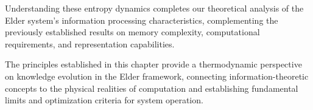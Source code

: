 Understanding these entropy dynamics completes our theoretical analysis of the Elder system's information processing characteristics, complementing the previously established results on memory complexity, computational requirements, and representation capabilities.

The principles established in this chapter provide a thermodynamic perspective on knowledge evolution in the Elder framework, connecting information-theoretic concepts to the physical realities of computation and establishing fundamental limits and optimization criteria for system operation.